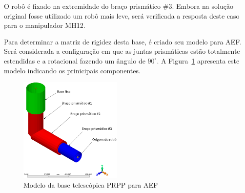 O robô é fixado na extremidade do braço prismático \#3. Embora na solução
original fosse utilizado um robô mais leve, será verificada a resposta
deste caso para o manipulador MH12.

Para determinar a matriz de rigidez desta base, é criado seu modelo para AEF.
Será considerada a configuração em que as juntas prismáticas estão totalmente
estendidas e a rotacional fazendo um ângulo de $90^\circ$. A
Figura~\ref{fig::base_telesc_fea} apresenta este modelo indicando os prinicipais
componentes.

\begin{figure}[h]
	\centering 
 	\includegraphics[width=0.45\textwidth]{figs/base_telesc_fea}
 	\caption{Modelo da base telescópica PRPP para AEF}
 	\label{fig::base_telesc_fea}
\end{figure}

